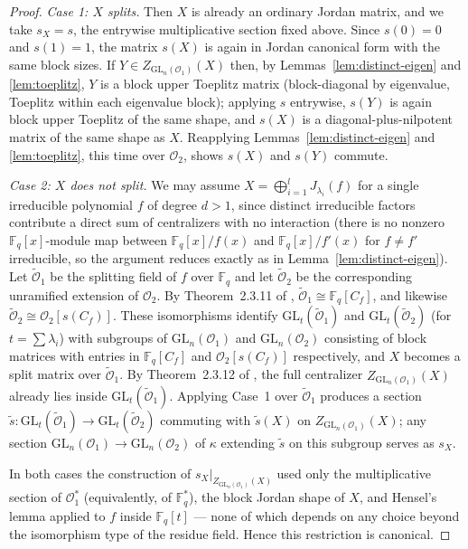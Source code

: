 \documentclass[11pt]{amsart}
\theoremstyle{definition}
\newcommand{\GL}{\mathrm{GL}}
\newcommand{\Fq}{\mathbb{F}_q}
\begin{document}
	\begin{proof}
		\emph{Case 1: $X$ splits.} Then $X$ is already an ordinary Jordan matrix,
		and we take $s_X=s$, the entrywise multiplicative section fixed above.
		Since $s(0)=0$ and $s(1)=1$, the matrix $s(X)$ is again in Jordan canonical
		form with the same block sizes. If $Y\in Z_{\GL_n(\mathcal O_1)}(X)$ then,
		by Lemmas~\ref{lem:distinct-eigen} and \ref{lem:toeplitz}, $Y$ is a block
		upper Toeplitz matrix (block-diagonal by eigenvalue, Toeplitz within each
		eigenvalue block); applying $s$ entrywise, $s(Y)$ is again block upper
		Toeplitz of the same shape, and $s(X)$ is a diagonal-plus-nilpotent matrix
		of the same shape as $X$. Reapplying Lemmas~\ref{lem:distinct-eigen} and
		\ref{lem:toeplitz}, this time over $\mathcal O_2$, shows $s(X)$ and $s(Y)$
		commute.
		
		\emph{Case 2: $X$ does not split.} We may assume $X=\bigoplus_{i=1}^l
		J_{\lambda_i}(f)$ for a single irreducible polynomial $f$ of degree $d>1$,
		since distinct irreducible factors contribute a direct sum of centralizers
		with no interaction (there is no nonzero $\Fq[x]$-module map between
		$\Fq[x]/f(x)$ and $\Fq[x]/f'(x)$ for $f\neq f'$ irreducible, so the
		argument reduces exactly as in Lemma~\ref{lem:distinct-eigen}). Let
		$\widetilde{\mathcal O}_1$ be the splitting field of $f$ over $\Fq$ and let
		$\widetilde{\mathcal O}_2$ be the corresponding unramified extension of
		$\mathcal O_2$. By Theorem~2.3.11 of \cite{Thesis}, $\widetilde{\mathcal
			O}_1\cong \Fq[C_f]$, and likewise $\widetilde{\mathcal O}_2\cong
		\mathcal O_2[s(C_f)]$. These isomorphisms identify $\GL_t(\widetilde{\mathcal
			O}_1)$ and $\GL_t(\widetilde{\mathcal O}_2)$ (for $t=\sum\lambda_i$) with
		subgroups of $\GL_n(\mathcal O_1)$ and $\GL_n(\mathcal O_2)$ consisting of
		block matrices with entries in $\Fq[C_f]$ and $\mathcal O_2[s(C_f)]$
		respectively, and $X$ becomes a split matrix over $\widetilde{\mathcal
			O}_1$. By Theorem~2.3.12 of \cite{Thesis}, the full centralizer
		$Z_{\GL_n(\mathcal O_1)}(X)$ already lies inside $\GL_t(\widetilde{\mathcal
			O}_1)$. Applying Case~1 over $\widetilde{\mathcal O}_1$ produces a section
		$\tilde s:\GL_t(\widetilde{\mathcal O}_1)\to\GL_t(\widetilde{\mathcal O}_2)$
		commuting with $\tilde s(X)$ on $Z_{\GL_n(\mathcal O_1)}(X)$; any section
		$\GL_n(\mathcal O_1)\to\GL_n(\mathcal O_2)$ of $\kappa$ extending $\tilde s$
		on this subgroup serves as $s_X$.
		
		In both cases the construction of $s_X|_{Z_{\GL_n(\mathcal O_1)}(X)}$ used
		only the multiplicative section of $\mathcal O_1^*$ (equivalently, of
		$\Fq^*$), the block Jordan shape of $X$, and Hensel's lemma applied to $f$
		inside $\Fq[t]$ — none of which depends on any choice beyond the
		isomorphism type of the residue field. Hence this restriction is canonical.
	\end{proof}
	
\end{document}
